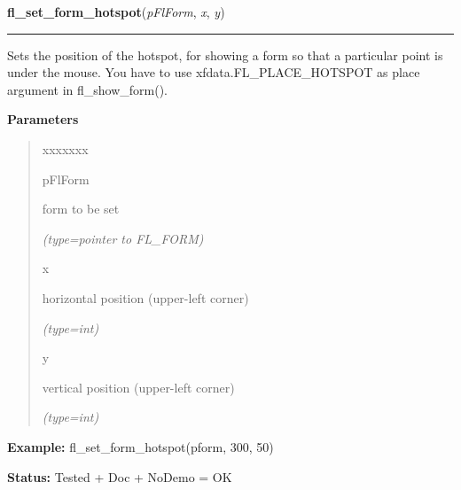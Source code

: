     \label{xformslib:flbasic:fl_set_form_hotspot}

    \vspace{0.5ex}

\hspace{.8\funcindent}\begin{boxedminipage}{\funcwidth}

    \raggedright \textbf{fl\_set\_form\_hotspot}(\textit{pFlForm}, \textit{x}, \textit{y})

    \vspace{-1.5ex}

    \rule{\textwidth}{0.5\fboxrule}
\setlength{\parskip}{2ex}
    Sets the position of the hotspot, for showing a form so that a 
    particular point is under the mouse. You have to use 
    xfdata.FL\_PLACE\_HOTSPOT as place argument in fl\_show\_form().

\setlength{\parskip}{1ex}
      \textbf{Parameters}
      \vspace{-1ex}

      \begin{quote}
        \begin{Ventry}{xxxxxxx}

          \item[pFlForm]

          form to be set

            {\it (type=pointer to FL\_FORM)}

          \item[x]

          horizontal position (upper-left corner)

            {\it (type=int)}

          \item[y]

          vertical position (upper-left corner)

            {\it (type=int)}

        \end{Ventry}

      \end{quote}

\textbf{Example:} fl\_set\_form\_hotspot(pform, 300, 50)



\textbf{Status:} Tested + Doc + NoDemo = OK



    \end{boxedminipage}

